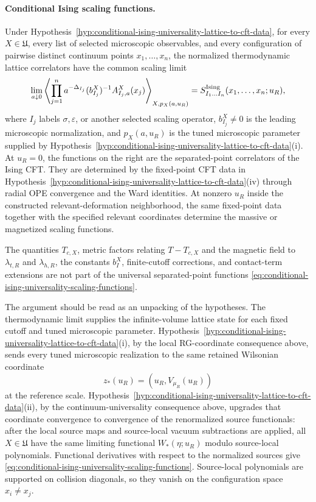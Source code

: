\paragraph{Conditional Ising scaling functions.}
Under Hypothesis~\ref{hyp:conditional-ising-universality-lattice-to-cft-data},
for every \(X\in\mathfrak U\), every list of selected microscopic
observables, and every configuration of pairwise distinct continuum points
\(x_1,\ldots,x_n\), the normalized thermodynamic lattice correlators have the
common scaling limit
\begin{equation}
  \lim_{a\downarrow0}
  \left\langle
    \prod_{j=1}^n
    a^{-\Delta_{I_j}}
    (b^X_{I_j})^{-1}A^X_{I_j,a}(x_j)
  \right\rangle_{X,p_X(a,u_R)}
  =
  S^{\rm Ising}_{I_1\ldots I_n}(x_1,\ldots,x_n;u_R),
  \label{eq:conditional-ising-universality-scaling-functions}
\end{equation}
where \(I_j\) labels \(\sigma,\varepsilon\), or another selected scaling
operator, \(b^X_{I_j}\neq0\) is the leading microscopic normalization, and
\(p_X(a,u_R)\) is the tuned microscopic parameter supplied by
Hypothesis~\ref{hyp:conditional-ising-universality-lattice-to-cft-data}\textup{(i)}.
At \(u_R=0\), the functions on the right are the separated-point
correlators of the Ising CFT.  They are determined by the fixed-point CFT
data in
Hypothesis~\ref{hyp:conditional-ising-universality-lattice-to-cft-data}\textup{(iv)}
through radial OPE convergence and the Ward identities.  At
nonzero \(u_R\) inside the constructed relevant-deformation neighborhood, the
same fixed-point data together with the specified relevant coordinates
determine the massive or magnetized scaling functions.

The quantities \(T_{c,X}\), metric factors relating \(T-T_{c,X}\) and the
magnetic field to \(\lambda_{t,R}\) and \(\lambda_{h,R}\), the constants
\(b^X_I\), finite-cutoff corrections, and contact-term extensions are not
part of the universal separated-point functions
\eqref{eq:conditional-ising-universality-scaling-functions}.

The argument should be read as an unpacking of the hypotheses.  The
thermodynamic limit supplies the infinite-volume lattice state for each
fixed cutoff and tuned microscopic parameter.
Hypothesis~\ref{hyp:conditional-ising-universality-lattice-to-cft-data}\textup{(i)},
by the local RG-coordinate consequence above, sends every tuned
microscopic realization to the same retained Wilsonian coordinate
\[
  z_\ast(u_R)=(u_R,V_{\mu_R}(u_R))
\]
at the reference scale.
Hypothesis~\ref{hyp:conditional-ising-universality-lattice-to-cft-data}\textup{(ii)},
by the continuum-universality consequence above, upgrades that
coordinate convergence to convergence of the renormalized source functionals:
after the local source maps and source-local vacuum subtractions are applied,
all \(X\in\mathfrak U\) have the same limiting functional
\(W_\ast(\eta;u_R)\) modulo source-local polynomials.  Functional derivatives
with respect to the normalized sources give
\eqref{eq:conditional-ising-universality-scaling-functions}.  Source-local
polynomials are supported on collision diagonals, so they vanish on the
configuration space \(x_i\neq x_j\).

